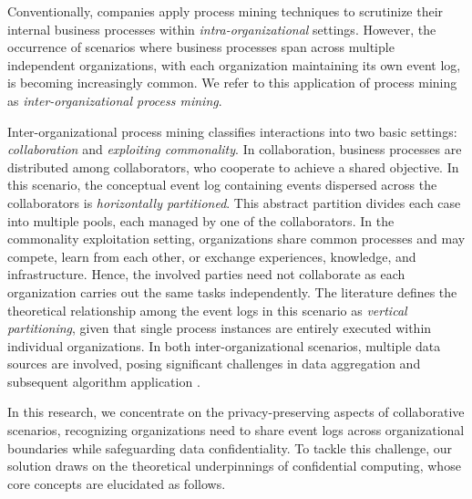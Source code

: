 \begin{newj}
Conventionally, companies apply process mining techniques to scrutinize their internal business processes within \emph{intra-organizational} settings. However, the occurrence of scenarios where business processes span across multiple independent organizations, with each organization maintaining its own event log, is becoming increasingly common. We refer to this application of process mining as \emph{inter-organizational process mining}.  

Inter-organizational process mining classifies interactions into two basic settings: \emph{collaboration} and \emph{exploiting commonality}. In collaboration, business processes are distributed among collaborators, who cooperate to achieve a shared objective. In this scenario, the conceptual event log containing events dispersed across the collaborators is \emph{horizontally partitioned}. This abstract partition divides each case into multiple pools, each managed by one of the collaborators. In the commonality exploitation setting, organizations share common processes and may compete, learn from each other, or exchange experiences, knowledge, and infrastructure. Hence, the involved parties need not collaborate as each organization carries out the same tasks independently. The literature defines the theoretical relationship among the event logs in this scenario as \emph{vertical partitioning}, given that single process instances are entirely executed within individual organizations. In both inter-organizational scenarios, multiple data sources are involved, posing significant challenges in data aggregation and subsequent algorithm application \cite{van2011intra}.

In this research, we concentrate on the privacy-preserving aspects of collaborative scenarios, recognizing organizations need to share event logs across organizational boundaries while safeguarding data confidentiality. To tackle this challenge, our solution draws on the theoretical underpinnings of confidential computing, whose core concepts are elucidated as follows.


\end{newj}
